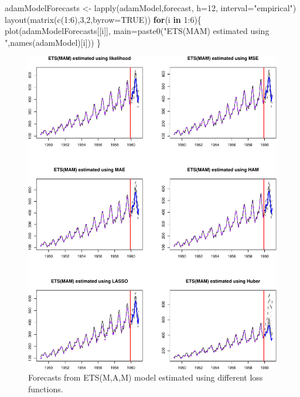 \documentclass[
]{book}
\newenvironment{Shaded}{\begin{snugshade}}{\end{snugshade}}
\newcommand{\AttributeTok}[1]{\textcolor[rgb]{0.77,0.63,0.00}{#1}}
\newcommand{\ConstantTok}[1]{\textcolor[rgb]{0.00,0.00,0.00}{#1}}
\newcommand{\ControlFlowTok}[1]{\textcolor[rgb]{0.13,0.29,0.53}{\textbf{#1}}}
\newcommand{\DecValTok}[1]{\textcolor[rgb]{0.00,0.00,0.81}{#1}}
\newcommand{\FunctionTok}[1]{\textcolor[rgb]{0.00,0.00,0.00}{#1}}
\newcommand{\NormalTok}[1]{#1}
\newcommand{\OtherTok}[1]{\textcolor[rgb]{0.56,0.35,0.01}{#1}}
\newcommand{\SpecialCharTok}[1]{\textcolor[rgb]{0.00,0.00,0.00}{#1}}
\newcommand{\StringTok}[1]{\textcolor[rgb]{0.31,0.60,0.02}{#1}}
\theoremstyle{definition}
\theoremstyle{definition}
\theoremstyle{definition}
\theoremstyle{definition}
\theoremstyle{remark}
\begin{document}
\begin{Shaded}
\begin{Highlighting}[]
\NormalTok{adamModelForecasts }\OtherTok{\textless{}{-}} \FunctionTok{lapply}\NormalTok{(adamModel,forecast,}
                             \AttributeTok{h=}\DecValTok{12}\NormalTok{, }\AttributeTok{interval=}\StringTok{"empirical"}\NormalTok{)}
\FunctionTok{layout}\NormalTok{(}\FunctionTok{matrix}\NormalTok{(}\FunctionTok{c}\NormalTok{(}\DecValTok{1}\SpecialCharTok{:}\DecValTok{6}\NormalTok{),}\DecValTok{3}\NormalTok{,}\DecValTok{2}\NormalTok{,}\AttributeTok{byrow=}\ConstantTok{TRUE}\NormalTok{))}
\ControlFlowTok{for}\NormalTok{(i }\ControlFlowTok{in} \DecValTok{1}\SpecialCharTok{:}\DecValTok{6}\NormalTok{)\{}
  \FunctionTok{plot}\NormalTok{(adamModelForecasts[[i]],}
       \AttributeTok{main=}\FunctionTok{paste0}\NormalTok{(}\StringTok{"ETS(MAM) estimated using "}\NormalTok{,}\FunctionTok{names}\NormalTok{(adamModel)[i]))}
\NormalTok{\}}
\end{Highlighting}
\end{Shaded}

\begin{figure}
\centering
\includegraphics{Svetunkov--2022----ADAM_files/figure-latex/adamModelsForecasts-1.pdf}
\caption{\label{fig:adamModelsForecasts}Forecasts from ETS(M,A,M) model estimated using different loss functions.}
\end{figure}
\end{document}

